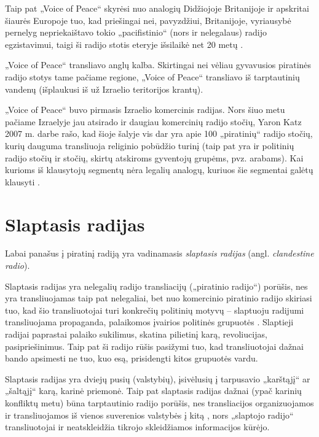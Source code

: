 \documentclass[kursinis-darbas]{vukf}
\begin{document}
Taip pat „Voice of Peace“ skyrėsi nuo analogių Didžiojoje Britanijoje ir apskritai šiaurės Europoje tuo, kad priešingai nei, pavyzdžiui, Britanijoje, vyriausybė pernelyg nepriekaištavo tokio „pacifistinio“ (nors ir nelegalaus) radijo egzistavimui, taigi ši radijo stotis eteryje išsilaikė net 20 metų \cite[p.~159]{os_the_noble_pirate_the_voice_of_peace_offshore_radio_station}.

„Voice of Peace“ transliavo anglų kalba. Skirtingai nei vėliau gyvavusios piratinės radijo stotys tame pačiame regione, „Voice of Peace“ transliavo iš tarptautinių vandenų (išplaukusi iš už Izraelio teritorijos krantų).

„Voice of Peace“ buvo pirmasis Izraelio komercinis radijas. Nors šiuo metu pačiame Izraelyje jau atsirado ir daugiau komercinių radijo stočių, Yaron Katz 2007 m. darbe rašo, kad šioje šalyje vis dar yra apie 100 „piratinių“ radijo stočių, kurių dauguma transliuoja religinio pobūdžio turinį (taip pat yra ir politinių radijo stočių ir stočių, skirtų atskiroms gyventojų grupėms, pvz. arabams). Kai kurioms iš klausytojų segmentų nėra legalių analogų, kuriuos šie segmentai galėtų klausyti \cite[p.389]{yk_the_other_media_alternative_communications_in_israel}.


\section{Slaptasis radijas}

Labai panašus į piratinį radiją yra vadinamasis \emph{slaptasis radijas} (angl. \emph{clandestine radio}).

Slaptasis radijas yra nelegalių radijo transliacijų („piratinio radijo“) porūšis, nes yra transliuojamas taip pat nelegaliai, bet nuo komercinio piratinio radijo skiriasi tuo, kad šio transliuotojai turi konkrečių politinių motyvų – slaptuoju radijumi transliuojama propaganda, palaikomos įvairios politinės grupuotės \cite[p.~334]{chs_encyclopedia_of_radio}. Slaptieji radijai paprastai palaiko sukilimus, skatina pilietinį karą, revoliucijas, pasipriešinimus. Taip pat ši radijo rūšis pasižymi tuo, kad transliuotojai dažnai bando apsimesti ne tuo, kuo esą, prisidengti kitos grupuotės vardu.

Slaptasis radijas yra dviejų pusių (valstybių), įsivėlusių į tarpusavio „karštąjį“ ar „šaltąjį“ karą, karinė priemonė. Taip pat slaptasis radijas dažnai (ypač karinių konfliktų metu) būna tarptautinio radijo porūšis, nes transliacijos organizuojamos ir transliuojamos iš vienos suverenios valstybės į kitą \cite[p.~749]{chs_encyclopedia_of_radio}, nors „slaptojo radijo“ transliuotojai ir neatskleidžia tikrojo skleidžiamos informacijos kūrėjo.
\end{document}
